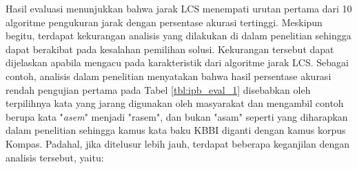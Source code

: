 Hasil evaluasi menunjukkan bahwa jarak LCS menempati urutan pertama dari 10 algoritme pengukuran jarak dengan persentase akurasi tertinggi. Meskipun begitu, terdapat kekurangan analisis yang dilakukan di dalam penelitian sehingga dapat berakibat pada kesalahan pemilihan solusi. Kekurangan tersebut dapat dijelaskan apabila mengacu pada karakteristik dari algoritme jarak LCS. Sebagai contoh, analisis dalam penelitian menyatakan bahwa hasil persentase akurasi rendah pengujian pertama pada Tabel \ref{tbl:ipb_eval_1} disebabkan oleh terpilihnya kata yang jarang digunakan oleh masyarakat dan mengambil contoh berupa kata "\textit{asem}" menjadi "rasem", dan bukan "asam" seperti yang diharapkan dalam penelitian sehingga kamus kata baku KBBI diganti dengan kamus korpus Kompas. Padahal, jika ditelusur lebih jauh, terdapat beberapa keganjilan dengan analisis tersebut, yaitu:

